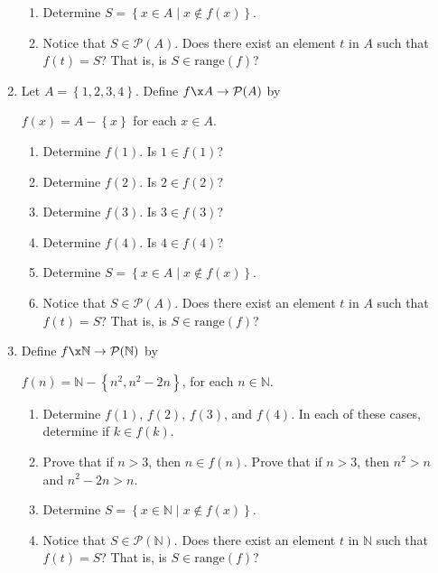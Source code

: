 \begin{previewactivity}
\begin{enumerate}
\begin{enumerate}
\item Determine $S = \left\{ x \in A \mid x \notin f ( x ) \right\}$.

\item Notice that $S \in \mathcal{P} ( A )$.  Does there exist an element $t$ in $A$ such that $f ( t ) = S$?  That is, is $S \in \text{range} ( f )$?
 
\end{enumerate}

\item Let $A = \left\{1, 2, 3, 4 \right\}$.  Define $f\x A \to \mathcal{P} ( A )$ by 
%
\begin{center}
$f ( x ) = A - \left\{ x \right\}$ for each $x \in A$.
\end{center}
%
\begin{multicols}{2}
\begin{enumerate}
\item Determine $f ( 1 )$.  Is $1 \in f ( 1 )$?
\item Determine $f ( 2 )$.  Is $2 \in f ( 2 )$?
\item Determine $f ( 3 )$.  Is $3 \in f ( 3 )$?
\item Determine $f ( 4 )$.  Is $4 \in f ( 4 )$?
\end{enumerate}
\end{multicols}
%
\begin{enumerate} \setcounter{enumii}{4}
\item Determine $S = \left\{ x \in A \mid x \notin f ( x ) \right\}$.

\item Notice that $S \in \mathcal{P} ( A )$.  Does there exist an element $t$ in $A$ such that $f ( t ) = S$?  That is, is $S \in \text{range} ( f )$?
\end{enumerate}
%
\item Define $f\x \mathbb{N} \to \mathcal{P} ( \mathbb{N} )$ by
%
\begin{center}
$f ( n ) = \mathbb{N} - \left\{n^2, n^2-2n \right\}$, for each $n \in \mathbb{N}$.
\end{center}
%
\begin{enumerate}
\item Determine $f ( 1 )$, $f ( 2 )$, $f ( 3 )$, and 
$f ( 4 )$.  In each of these cases, determine if $k \in f ( k )$.
%
\item Prove that if $n > 3$, then $n \in f ( n )$.  \hint  Prove that if $n >3$, then 
$n^2 > n$ and $n^2 - 2n >n$.

\item Determine $S = \left\{ x \in \mathbb{N} \mid x \notin f ( x ) \right\}$.

\item Notice that $S \in \mathcal{P} ( \mathbb{N} )$.  Does there exist an element $t$ in $\mathbb{N}$ such that $f ( t ) = S$?  That is, is 
$S \in \text{range} ( f )$?

\end{enumerate}
\end{enumerate}
\end{previewactivity}
\hbreak

